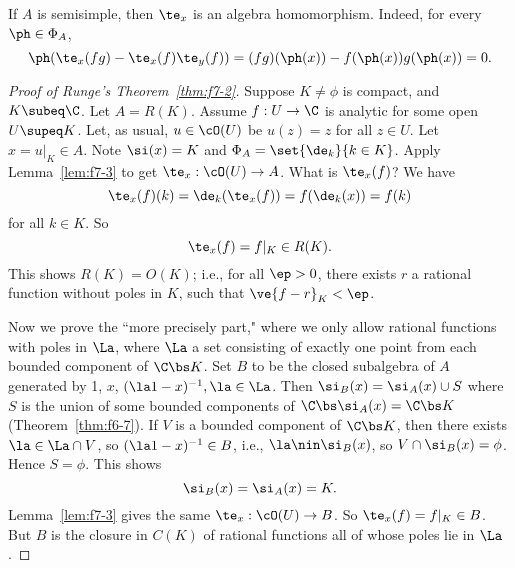 \begin{rem}
If $A$ is semisimple, then $\te_x$ is an algebra homomorphism. Indeed, for every $\ph\in \Phi_A$,
\[
\ph(\te_x(fg)-\te_x(f)\te_y(f))=(fg)(\ph(x))-f(\ph(x))g(\ph(x))=0.
\]
\end{rem}
\begin{proof}[Proof of Runge's Theorem~\ref{thm:f7-2}]
Suppose $K\ne \phi$ is compact, and $K\subeq \C$. Let $A=R(K)$. Assume $f:U\to \C$ is analytic for some open $U\supeq K$. %
Let, as usual, $u\in \cO(U)$ be $u(z)=z$ for all $z\in U$. Let $x=u|_K\in A$.  Note $\si(x)=K$ %
and $\Phi_A=\set{\de_k}{k\in K}$. Apply Lemma~\ref{lem:f7-3} to get $\te_x:\cO(U)\to A$. What is $\te_x(f)$? We have
\[
\te_x(f)(k)=\de_k(\te_x(f))=f(\de_k(x))=f(k)
\]
for all $k\in K$. So 
\[
\te_x(f)=f|_K\in R(K).
\]
This shows $R(K)=O(K)$; i.e., for all $\ep>0$, there exists $r$ a rational function without poles in $K$, such that $\ve{f-r}_K<\ep$. %

 Now we prove the ``more precisely part," where we only allow rational functions with poles in $\La$, where $\La$ a set consisting of exactly one point from each bounded component of $\C\bs K$. Set $B$ to be the closed subalgebra of $A$ generated by 1, $x$, $(\la 1-x)^{-1},\la\in \La$. Then $\si_B(x)=\si_A(x)\cup S$ where $S$ is the union of some bounded components of $\C\bs \si_A(x)=\C\bs K$ (Theorem~\ref{thm:f6-7}). If $V$ is a bounded component of $\C\bs K$, then there exists $\la\in \La\cap V$, so $(\la 1-x)^{-1}\in B$, i.e., $\la\nin \si_B(x)$, so $V\cap \si_B(x)=\phi$. Hence $S=\phi$. This shows 
\[\si_B(x)=\si_A(x)=K.\]
Lemma~\ref{lem:f7-3} gives the same $\te_x:\cO(U)\to B$. So $\te_x(f)=f|_K\in B$. But $B$ is the closure in $C(K)$ of rational functions all of whose poles lie in $\La$.
\end{proof}






